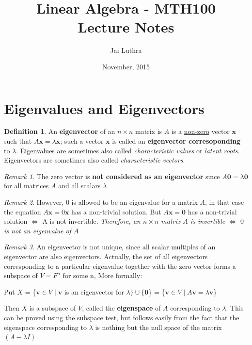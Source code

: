 \documentclass[]{extarticle}
\title{Linear Algebra - MTH100\\ Lecture Notes}
\author{Jai Luthra}
\date{November, 2015}
\theoremstyle{Simple}
\theoremstyle{definition}
\newtheorem{defn}{Definition}[section]
\theoremstyle{remark}
\newtheorem*{rem}{Remark}
\theoremstyle{example}
\begin{document}
\maketitle

\section{Eigenvalues and Eigenvectors}

\begin{defn}

An \textbf{eigenvector} of an $n \times n$ matrix is $A$ is a \underline{non-zero} vector $\bm{x}$ such that $A\bm{x} = \lambda\bm{x}$; such a vector $\bm{x}$ is called an \textbf{eigenvector corresoponding} to $\lambda$.
Eigenvalues are sometimes also called \textit{characteristic values} or \textit{latent roots}. Eigenvectors are sometimes also called \textit{characteristic vectors}.

\end{defn}

\begin{rem}
The zero vector is \textbf{not considered as an eigenvector} since $A\bm{0} = \lambda \bm{0}$ for all matrices $A$ and all scalars $\lambda$
\end{rem}

\begin{rem}
However, $0$ is allowed to be an eigenvalue for a matrix $A$, in that case the equation $A\bm{x} = 0\bm{x}$ has a non-trivial solution.
But $A\bm{x} = \bm{0}$ has a non-trivial solution $\bm{\iff}$ A is not invertible. \textit{Therefore, an $n \times n$ matrix $A$ is invertible $\iff$ $0$ is not an eigenvalue of $A$}
\end{rem}

\begin{rem}
An eigenvector is not unique, since all scalar
multiples of an eigenvector are also eigenvectors.
Actually, the set of all eigenvectors corresponding to a
particular eigenvalue together with the zero vector forms a
subspace of $V = F^n$ for some n, More formally:

Put $X$ = \{$ \bm{v} \in V \mid \bm{v} $ is an eigenvector for $\lambda\} \cup \{\bm{0}$\} = \{$\bm{v} \in V \mid A \bm{v} = \lambda \bm{v}$\}

Then $X$ is a subspace of $V$, called the \textbf{eigenspace} of $A$
corresponding to $\lambda$. This can be proved using the subspace test, but follows easily from the fact that the eigenspace corresponding to $\lambda$ is nothing but the null space of the matrix $(A \mathbin{-} \lambda I)$.
\end{rem}
\end{document}

